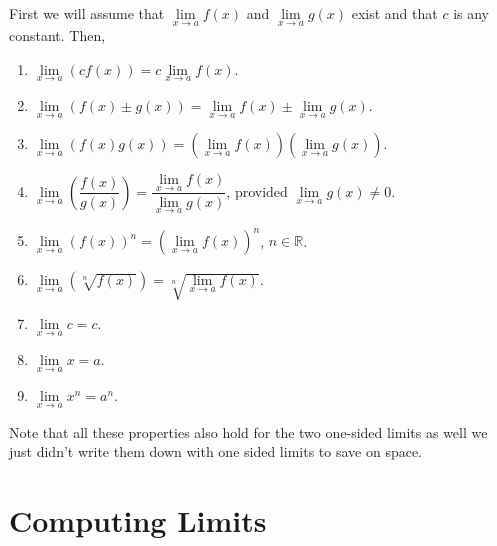 \documentclass[10pt,reqno]{book}
\def\R{\mathbb{R}}
\begin{document}
	First we will assume that $ \lim\limits_{x\to a} f(x) $ and $ \lim\limits_{x\to a} g(x) $ exist and that $ c $ is any constant. Then,
	\begin{enumerate}
		\item $ \lim\limits_{x\to a} (c f(x)) = c \lim\limits_{x\to a} f(x) $.
		
		\item $ \lim\limits_{x\to a} (f(x) \pm g(x)) = \lim\limits_{x\to a} f(x) \pm \lim\limits_{x\to a} g(x) $.
		
		\item $ \lim\limits_{x\to a} (f(x) g(x)) = \left( \lim\limits_{x\to a} f(x) \right) \left( \lim\limits_{x\to a} g(x) \right) $.
		
		\item $ \lim\limits_{x\to a} \left( \dfrac{f(x)}{g(x)} \right) = \dfrac{\lim\limits_{x\to a} f(x)}{\lim\limits_{x\to a} g(x)} $, provided $ \lim\limits_{x\to a} g(x) \neq 0 $.
		
		\item $ \lim\limits_{x\to a} (f(x))^n = \left( \lim\limits_{x\to a} f(x) \right)^n  $, $ n \in \R $.
		
		\item $ \lim\limits_{x\to a} \left( \sqrt[n]{f(x)} \right) = \sqrt[n]{\lim\limits_{x\to a} f(x)} $.
		
		\item $ \lim\limits_{x\to a} c = c $.
		
		\item $ \lim\limits_{x\to a} x = a $.
		
		\item $ \lim\limits_{x\to a} x^n = a^n $.
	\end{enumerate}
	Note that all these properties also hold for the two one-sided limits as well we just didn't write them down with one sided limits to save on space.
	
	\section{Computing Limits}
	
\end{document}
